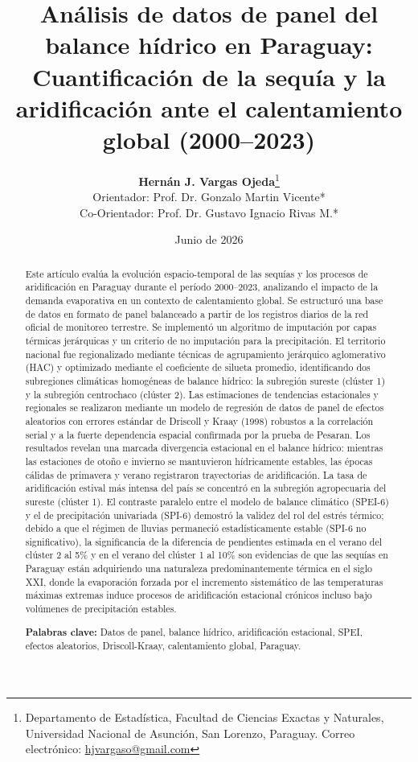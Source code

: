 \documentclass[11pt,a4paper]{article}
\title{\textbf{Análisis de datos de panel del balance hídrico en Paraguay: Cuantificación de la sequía y la aridificación ante el calentamiento global (2000--2023)}}
\author{
    \textbf{Hernán J. Vargas Ojeda}\thanks{Departamento de Estadística, Facultad de Ciencias Exactas y Naturales, Universidad Nacional de Asunción, San Lorenzo, Paraguay. Correo electrónico: \href{mailto:hjvargaso@gmail.com}{hjvargaso@gmail.com}} \\
    \small Orientador: Prof. Dr. Gonzalo Martin Vicente* \\
    \small Co-Orientador: Prof. Dr. Gustavo Ignacio Rivas M.*
}
\date{\small Junio de 2026}
\begin{document}
\maketitle

\begin{abstract}
\noindent Este artículo evalúa la evolución espacio-temporal de las sequías y los procesos de aridificación en Paraguay durante el período 2000--2023, analizando el impacto de la demanda evaporativa en un contexto de calentamiento global. Se estructuró una base de datos en formato de panel balanceado a partir de los registros diarios de la red oficial de monitoreo terrestre. Se implementó un algoritmo de imputación por capas térmicas jerárquicas y un criterio de no imputación para la precipitación. El territorio nacional fue regionalizado mediante técnicas de agrupamiento jerárquico aglomerativo (HAC) y optimizado mediante el coeficiente de silueta promedio, identificando dos subregiones climáticas homogéneas de balance hídrico: la subregión sureste (clúster 1) y la subregión centrochaco (clúster 2). Las estimaciones de tendencias estacionales y regionales se realizaron mediante un modelo de regresión de datos de panel de efectos aleatorios con errores estándar de Driscoll y Kraay (1998) robustos a la correlación serial y a la fuerte dependencia espacial confirmada por la prueba de Pesaran. Los resultados revelan una marcada divergencia estacional en el balance hídrico: mientras las estaciones de otoño e invierno se mantuvieron hídricamente estables, las épocas cálidas de primavera y verano registraron trayectorias de aridificación. La tasa de aridificación estival más intensa del país se concentró en la subregión agropecuaria del sureste (clúster 1). El contraste paralelo entre el modelo de balance climático (SPEI-6) y el de precipitación univariada (SPI-6) demostró la validez del rol del estrés térmico; debido a que el régimen de lluvias permaneció estadísticamente estable (SPI-6 no significativo), la significancia de la diferencia de pendientes estimada en el verano del clúster 2 al 5\% y en el verano del clúster 1 al 10\% son evidencias de que las sequías en Paraguay están adquiriendo una naturaleza predominantemente térmica en el siglo XXI, donde la evaporación forzada por el incremento sistemático de las temperaturas máximas extremas induce procesos de aridificación estacional crónicos incluso bajo volúmenes de precipitación estables.

\noindent \textbf{Palabras clave:} Datos de panel, balance hídrico, aridificación estacional, SPEI, efectos aleatorios, Driscoll-Kraay, calentamiento global, Paraguay.
\end{abstract}
\end{document}
